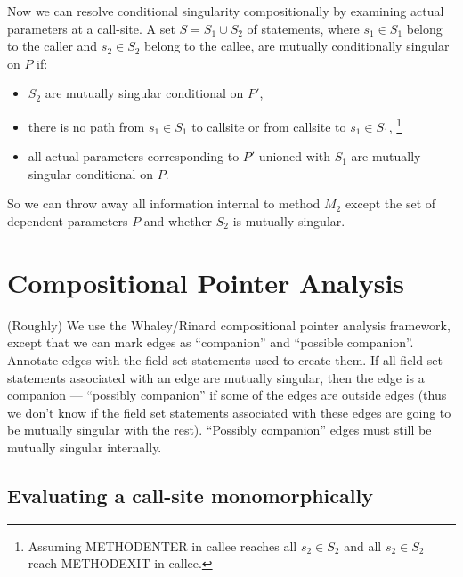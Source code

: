 \documentclass[11pt,notitlepage]{article}
\begin{document}
Now we can resolve conditional singularity compositionally by
examining actual parameters at a call-site.
A set $S=S_1 \cup S_2$ of statements,
where $s_1\in S_1$ belong to the caller and $s_2\in S_2$ belong to the
callee, are mutually conditionally singular on $P$ if:
\begin{itemize}
\item $S_2$ are mutually singular conditional on $P'$,
\item there is no path from $s_1 \in S_1$ to callsite or
             from callsite to $s_1\in S_1$,%
\footnote{Assuming METHODENTER in callee reaches all $s_2\in S_2$ and
          all $s_2\in S_2$ reach METHODEXIT in callee.}
\item all actual parameters corresponding to $P'$ unioned with $S_1$
  are mutually singular conditional on $P$.
\end{itemize}


So we can throw away all information internal to method $M_2$ except
the set of dependent parameters $P$ and whether $S_2$ is mutually singular.


\section{Compositional Pointer Analysis}

(Roughly) We use the Whaley/Rinard compositional pointer analysis
framework, except that we can mark edges as ``companion'' and
``possible companion''.  Annotate edges with the field set statements
used to create them.  If all field set statements associated with an
edge are mutually singular, then the edge is a companion ---
``possibly companion'' if some of the edges are outside edges (thus
we don't know if the field set statements associated with these edges
are going to be mutually singular with the rest).  ``Possibly
companion'' edges must still be mutually singular internally.

\subsection{Evaluating a call-site monomorphically}
\end{document}
